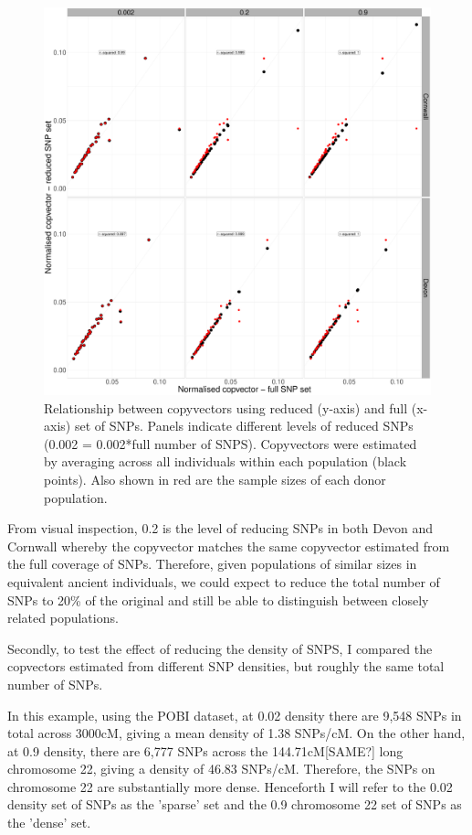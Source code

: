 \begin{figure}[htp]
    \centering
    \includegraphics[width=1.0\textwidth]{../images/chapter1/Devon_Cornwall_copyvectors_sample_size_reduced.pdf}
    \caption{Relationship between copyvectors using reduced (y-axis) and full (x-axis) set of SNPs. Panels indicate different levels of reduced SNPs (0.002 = 0.002*full number of SNPS). Copyvectors were estimated by averaging across all individuals within each population (black points). Also shown in red are the sample sizes of each donor population.}
    \label{fig:Devon_Cornwall_copyvectors_sample_size_reduced}
\end{figure}

From visual inspection, 0.2 is the level of reducing SNPs in both Devon and Cornwall whereby the copyvector matches the same copyvector estimated from the full coverage of SNPs. Therefore, given populations of similar sizes in equivalent ancient individuals, we could expect to reduce the total number of SNPs to 20\% of the original and still be able to distinguish between closely related populations.  

Secondly, to test the effect of reducing the density of SNPS, I compared the copvectors estimated from different SNP densities, but roughly the same total number of SNPs. 

In this example, using the POBI dataset, at 0.02 density there are 9,548 SNPs in total across 3000cM, giving a mean density of 1.38 SNPs/cM. On the other hand, at 0.9 density, there are 6,777 SNPs across the 144.71cM{\color{red}[SAME?]} long chromosome 22, giving a density of 46.83 SNPs/cM. Therefore, the SNPs on chromosome 22 are substantially more dense. Henceforth I will refer to the 0.02 density set of SNPs as the 'sparse' set and the 0.9 chromosome 22 set of SNPs as the 'dense' set. 

